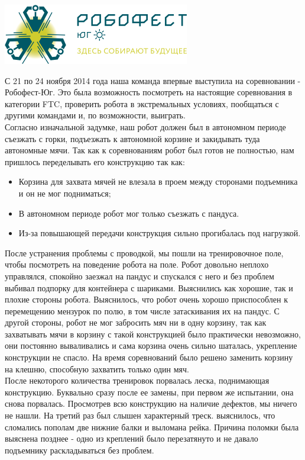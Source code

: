 \begin{center}
	\includegraphics{Days/21-24.11.14/robofest_logo.png}
\end{center}
С 21 по 24 ноября 2014 года наша команда впервые выступила на соревновании - Робофест-Юг. Это была возможность посмотреть на настоящие соревнования в категории FTC, проверить робота в экстремальных условиях, пообщаться с другими командами и, по возможности, выиграть.\\
Согласно изначальной задумке, наш робот должен был в автономном периоде съезжать с горки, подъезжать к автономной корзине и закидывать туда автономные мячи. Так как к соревнованиям робот был готов не полностью, нам пришлось переделывать его конструкцию так как:
\begin{itemize}
	\item Корзина для захвата мячей не влезала в проем между сторонами подъемника и он не мог подниматься;
	\item В автономном периоде робот мог только съезжать с пандуса.
	\item Из-за повышающей передачи конструкция сильно прогибалась под нагрузкой.
\end{itemize}
После устранения проблемы с проводкой, мы пошли на тренировочное поле, чтобы посмотреть на поведение робота на поле. Робот довольно неплохо управлялся, спокойно заезжал на пандус и спускался с него и без проблем выбивал подпорку для контейнера с шариками. Выяснились как хорошие, так и плохие стороны робота. Выяснилось, что робот очень хорошо приспособлен к перемещению мензурок по полю, в том числе затаскивания их на пандус. С другой стороны, робот не мог забросить мяч ни в одну корзину, так как захватывать мячи в корзину с такой конструкцией было практически невозможно, они постоянно вываливались и сама корзина очень сильно шаталась, укрепление конструкции не спасло. На время соревнований было решено заменить корзину на клешню, способную захватить только один мяч. \\
После некоторого количества тренировок порвалась леска, поднимающая конструкцию. Буквально сразу после ее замены, при первом же испытании, она снова порвалась. Просмотрев всю конструкцию на наличие дефектов, мы ничего не нашли. На третий раз был слышен характерный треск. выяснилось, что сломались пополам две нижние балки и выломана рейка. Причина поломки была выяснена позднее - одно из креплений было перезатянуто и не давало подъемнику раскладываться без проблем. \\
